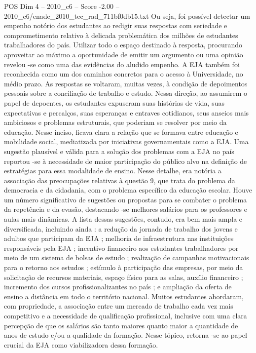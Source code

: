 \begin{textsample}{POS Dim 4 – 2010\_c6 – Score -2.00 – 2010\_c6/enade\_2010\_tec\_rad\_711bf0db15.txt}
Ou seja, foi possível detectar um empenho notório dos estudantes ao redigir suas respostas com seriedade e comprometimento relativo à delicada problemática dos milhões de estudantes trabalhadores do país.
Utilizar todo o espaço destinado à resposta, procurando aproveitar ao máximo a oportunidade de emitir um argumento ou uma opinião revelou -se como uma das evidências do aludido empenho.
A EJA também foi reconhecida como um dos caminhos concretos para o acesso à Universidade, no médio prazo.
As respostas se voltaram, muitas vezes, à condição de depoimentos pessoais sobre a conciliação de trabalho e estudo.
Nessa direção, ao assumirem o papel de depoentes, os estudantes expuseram suas histórias de vida, suas expectativas e percalços, suas esperanças e entraves cotidianos, seus anseios mais ambiciosos e problemas estruturais, que poderiam se resolver por meio da educação.
Nesse inciso, ficava clara a relação que se formava entre educação e mobilidade social, mediatizada por iniciativas governamentais como a EJA.
Uma sugestão plausível e válida para a solução dos problemas com a EJA no país reportou -se à necessidade de maior participação do público alvo na definição de estratégias para essa modalidade de ensino.
Nesse detalhe, era notória a associação das preocupações relativas à questão 9, que trata do problema da democracia e da cidadania, com o problema específico da educação escolar.
Houve um número significativo de sugestões ou propostas para se combater o problema da repetência e da evasão, destacando -se melhores salários para os professores e aulas mais dinâmicas.
A lista dessas sugestões, contudo, era bem mais ampla e diversificada, incluindo ainda : a redução da jornada de trabalho dos jovens e adultos que participam da EJA ; melhoria de infraestrutura nas instituições responsáveis pela EJA ; incentivo financeiro aos estudantes trabalhadores por meio de um sistema de bolsas de estudo ; realização de campanhas motivacionais para o retorno aos estudos ; estímulo à participação das empresas, por meio da solicitação de recursos materiais, espaço físico para as salas, auxílio financeiro ; incremento dos cursos profissionalizantes no país ; e ampliação da oferta de ensino a distância em todo o território nacional.
Muitos estudantes abordaram, com propriedade, a associação entre um mercado de trabalho cada vez mais competitivo e a necessidade de qualificação profissional, inclusive com uma clara percepção de que os salários são tanto maiores quanto maior a quantidade de anos de estudo e/ou a qualidade da formação.
Nesse tópico, retorna -se ao papel crucial da EJA como viabilizadora dessa formação.

\end{textsample}

